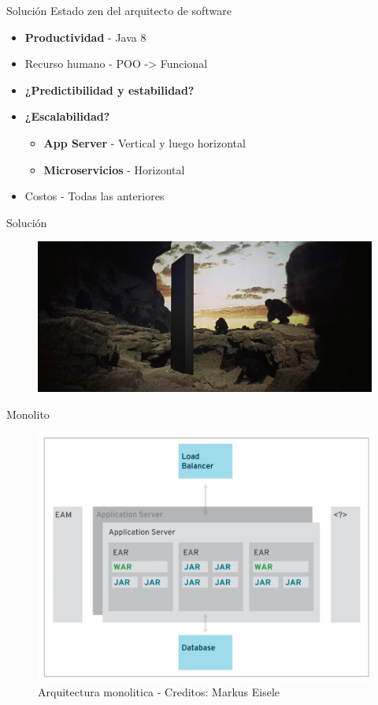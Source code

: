 \documentclass{beamer}
\begin{document}
\begin{frame}{Solución}
Estado zen del arquitecto de software
\begin{itemize}
	\item \textbf{Productividad} - Java 8
	\item Recurso humano - POO -> Funcional
	\item \textbf{¿Predictibilidad y estabilidad?}
	\item \textbf{¿Escalabilidad?}
	\begin{itemize}
		\item \textbf{App Server} - Vertical y luego horizontal
		\item \textbf{Microservicios} - Horizontal
	\end{itemize}
	\item Costos - Todas las anteriores
\end{itemize}
\end{frame}

\begin{frame}{Solución}
\begin{figure}
	\centering
	\includegraphics[width=\linewidth]{Images/monolith}
\end{figure}
\end{frame}

\begin{frame}{Monolito}
\begin{figure}
	\centering
	\includegraphics[width=0.7\linewidth]{Images/monolitos}
	\caption{Arquitectura monolitica - Creditos: Markus Eisele}
\end{figure}
\end{frame}
\end{document}
